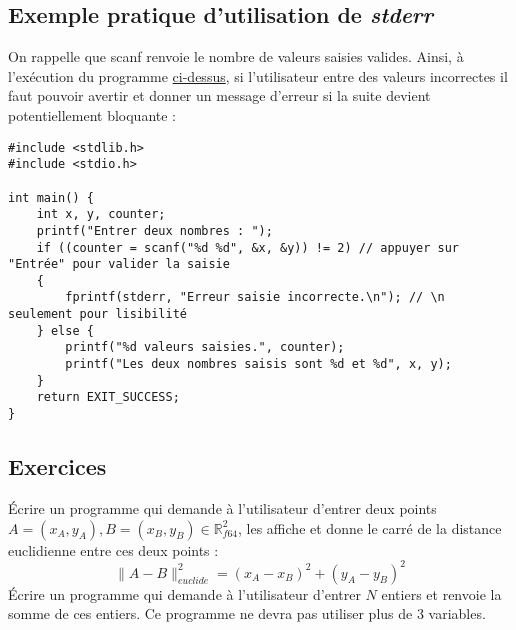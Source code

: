 \documentclass[../../../main.tex]{subfiles}
\begin{document}
\subsection{Exemple pratique d'utilisation de \textit{stderr}}
On rappelle que \textsf{scanf} renvoie le nombre de valeurs saisies valides. Ainsi, à l'exécution du programme \hyperref[lst:prgm1]{ci-dessus}{}, si l'utilisateur entre des valeurs incorrectes il faut pouvoir avertir et donner un message d'erreur si la suite devient potentiellement bloquante :
	\begin{verbatim}
#include <stdlib.h>
#include <stdio.h>

int main() {
	int x, y, counter;
	printf("Entrer deux nombres : ");
	if ((counter = scanf("%d %d", &x, &y)) != 2) // appuyer sur "Entrée" pour valider la saisie
	{
		fprintf(stderr, "Erreur saisie incorrecte.\n"); // \n seulement pour lisibilité
	} else {
		printf("%d valeurs saisies.", counter);
		printf("Les deux nombres saisis sont %d et %d", x, y);
	}
	return EXIT_SUCCESS;
}
	\end{verbatim}
\subsection{Exercices}
Écrire un programme qui demande à l'utilisateur d'entrer deux points $A = (x_{A}, y_{A}), B = (x_{B}, y_{B})\in{\mathbb{R}_{f64}^{2}}$, les affiche et donne le carré de la distance euclidienne entre ces deux points :
$$\lVert{A - B}\rVert^{2}_{euclide} = (x_{A} - x_{B})^{2} + (y_{A} - y_{B})^{2}$$
Écrire un programme qui demande à l'utilisateur d'entrer $N$ entiers et renvoie la somme de ces entiers. Ce programme ne devra pas utiliser plus de 3 variables.
\end{document}
